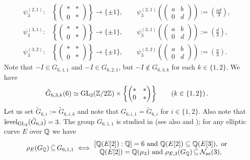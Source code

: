 \[
\begin{split}
\psi_3^{(2,1)} : &\left\{ \begin{pmatrix} * & * \\ 0 & * \end{pmatrix} \right\} \longrightarrow \{ \pm 1 \}, \quad\quad \psi_3^{(2,1)}\left( \begin{pmatrix} a & b \\ 0 & d \end{pmatrix} \right) := \left( \frac{ad}{3} \right), \\
\psi_3^{(3,1)} : &\left\{ \begin{pmatrix} * & * \\ 0 & * \end{pmatrix} \right\} \longrightarrow \{ \pm 1 \}, \quad\quad \psi_3^{(3,1)}\left( \begin{pmatrix} a & b \\ 0 & d \end{pmatrix} \right) := \left( \frac{d}{3} \right), \\
\psi_3^{(3,2)} : &\left\{ \begin{pmatrix} * & * \\ 0 & * \end{pmatrix} \right\} \longrightarrow \{ \pm 1 \}, \quad\quad \psi_3^{(3,2)}\left( \begin{pmatrix} a & b \\ 0 & d \end{pmatrix} \right) := \left( \frac{a}{3} \right).
\end{split}
\]
Note that $-I \in G_{6,1,1}$ and $-I \in G_{6,2,1}$, but $-I \notin G_{6,3,k}$ for each $k \in \{ 1, 2 \}$. We have 
\begin{equation} \label{tildeGsub63j}
\tilde{G}_{6,3,k}(6) \simeq \operatorname{GL}_2(\mathbb{Z}/2\mathbb{Z}) \times \left\{ \begin{pmatrix} * & * \\ 0 & * \end{pmatrix} \right\} \quad\quad \left( k \in \{1, 2 \} \right).
\end{equation}
Let us set $\tilde{G}_{6,i} := \tilde{G}_{6,i,k}$ and note that $G_{6,i,1} = \tilde{G}_{6,i}$ for $i \in \{ 1, 2 \}$. Also note that
$\operatorname{level}_{\operatorname{GL}_2}(\tilde{G}_{6,3}) = 3$. The group $G_{6,1,1}$ is studied in \cite{braujones} (see also \cite{jonesmcmurdy} and \cite{morrow}); for any elliptic curve $E$ over $\mathbb{Q}$ we have
\[
\rho_{E}(G_{\mathbb{Q}}) \, \dot\subseteq \, G_{6,1,1} \; \Longleftrightarrow \; 
\begin{matrix} 
\left[ \mathbb{Q}(E[2]) : \mathbb{Q} \right] = 6 \text{ and } \mathbb{Q}(E[2]) \subseteq \mathbb{Q}(E[3]), \text{ or} \\
\mathbb{Q}(E[2]) = \mathbb{Q}(\mu_3) \text{ and } \rho_{E,3}(G_{\mathbb{Q}}) \, \dot\subseteq \, \mathcal{N}_{\operatorname{ns}}(3),
\end{matrix} 
\]
